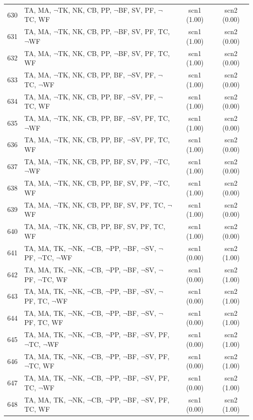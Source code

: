\documentclass[12pt]{article}
\begin{document}
\begin{longtable}{|l|l|c|c|}
630 & TA, MA, $\neg$TK, NK, CB, PP, $\neg$BF, SV, PF, $\neg$TC, WF & scn1 (1.00) & scn2 (0.00)\\
631 & TA, MA, $\neg$TK, NK, CB, PP, $\neg$BF, SV, PF, TC, $\neg$WF & scn1 (1.00) & scn2 (0.00)\\
632 & TA, MA, $\neg$TK, NK, CB, PP, $\neg$BF, SV, PF, TC, WF & scn1 (1.00) & scn2 (0.00)\\
633 & TA, MA, $\neg$TK, NK, CB, PP, BF, $\neg$SV, PF, $\neg$TC, $\neg$WF & scn1 (1.00) & scn2 (0.00)\\
634 & TA, MA, $\neg$TK, NK, CB, PP, BF, $\neg$SV, PF, $\neg$TC, WF & scn1 (1.00) & scn2 (0.00)\\
635 & TA, MA, $\neg$TK, NK, CB, PP, BF, $\neg$SV, PF, TC, $\neg$WF & scn1 (1.00) & scn2 (0.00)\\
636 & TA, MA, $\neg$TK, NK, CB, PP, BF, $\neg$SV, PF, TC, WF & scn1 (1.00) & scn2 (0.00)\\
637 & TA, MA, $\neg$TK, NK, CB, PP, BF, SV, PF, $\neg$TC, $\neg$WF & scn1 (1.00) & scn2 (0.00)\\
638 & TA, MA, $\neg$TK, NK, CB, PP, BF, SV, PF, $\neg$TC, WF & scn1 (1.00) & scn2 (0.00)\\
639 & TA, MA, $\neg$TK, NK, CB, PP, BF, SV, PF, TC, $\neg$WF & scn1 (1.00) & scn2 (0.00)\\
640 & TA, MA, $\neg$TK, NK, CB, PP, BF, SV, PF, TC, WF & scn1 (1.00) & scn2 (0.00)\\
641 & TA, MA, TK, $\neg$NK, $\neg$CB, $\neg$PP, $\neg$BF, $\neg$SV, $\neg$PF, $\neg$TC, $\neg$WF & scn1 (0.00) & scn2 (1.00)\\
642 & TA, MA, TK, $\neg$NK, $\neg$CB, $\neg$PP, $\neg$BF, $\neg$SV, $\neg$PF, $\neg$TC, WF & scn1 (0.00) & scn2 (1.00)\\
643 & TA, MA, TK, $\neg$NK, $\neg$CB, $\neg$PP, $\neg$BF, $\neg$SV, $\neg$PF, TC, $\neg$WF & scn1 (0.00) & scn2 (1.00)\\
644 & TA, MA, TK, $\neg$NK, $\neg$CB, $\neg$PP, $\neg$BF, $\neg$SV, $\neg$PF, TC, WF & scn1 (0.00) & scn2 (1.00)\\
645 & TA, MA, TK, $\neg$NK, $\neg$CB, $\neg$PP, $\neg$BF, $\neg$SV, PF, $\neg$TC, $\neg$WF & scn1 (0.00) & scn2 (1.00)\\
646 & TA, MA, TK, $\neg$NK, $\neg$CB, $\neg$PP, $\neg$BF, $\neg$SV, PF, $\neg$TC, WF & scn1 (0.00) & scn2 (1.00)\\
647 & TA, MA, TK, $\neg$NK, $\neg$CB, $\neg$PP, $\neg$BF, $\neg$SV, PF, TC, $\neg$WF & scn1 (0.00) & scn2 (1.00)\\
648 & TA, MA, TK, $\neg$NK, $\neg$CB, $\neg$PP, $\neg$BF, $\neg$SV, PF, TC, WF & scn1 (0.00) & scn2 (1.00)\\

\end{longtable}
\end{document}
